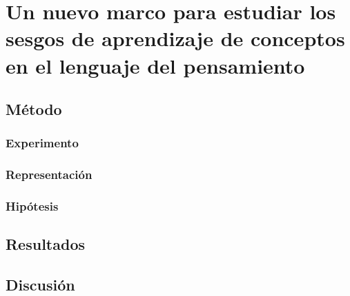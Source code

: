 \chapter{Un nuevo marco para estudiar los sesgos de aprendizaje de conceptos en el lenguaje del pensamiento}

\section{Método}
\subsection{Experimento}
\subsection{Representación}
\subsection{Hipótesis}
\section{Resultados}
\section{Discusión}
